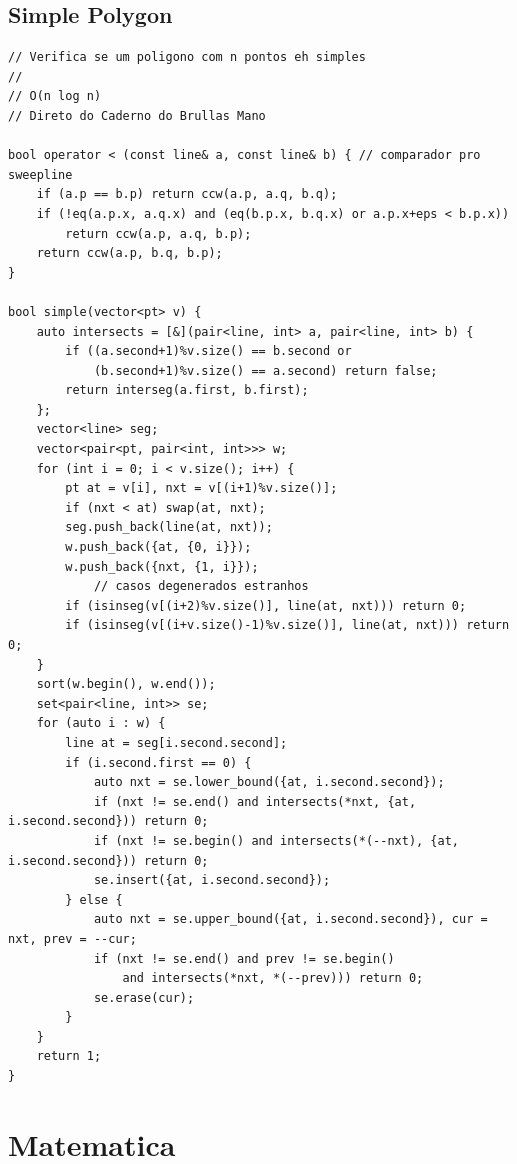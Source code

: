 \documentclass[11pt, a4paper, twoside]{article}
\begin{document}
\subsection{Simple Polygon}
\begin{verbatim}
// Verifica se um poligono com n pontos eh simples
//
// O(n log n)
// Direto do Caderno do Brullas Mano

bool operator < (const line& a, const line& b) { // comparador pro sweepline
	if (a.p == b.p) return ccw(a.p, a.q, b.q);
	if (!eq(a.p.x, a.q.x) and (eq(b.p.x, b.q.x) or a.p.x+eps < b.p.x))
		return ccw(a.p, a.q, b.p);
	return ccw(a.p, b.q, b.p);
}

bool simple(vector<pt> v) {
	auto intersects = [&](pair<line, int> a, pair<line, int> b) {
		if ((a.second+1)%v.size() == b.second or
			(b.second+1)%v.size() == a.second) return false;
		return interseg(a.first, b.first);
	};
	vector<line> seg;
	vector<pair<pt, pair<int, int>>> w;
	for (int i = 0; i < v.size(); i++) {
		pt at = v[i], nxt = v[(i+1)%v.size()];
		if (nxt < at) swap(at, nxt);
		seg.push_back(line(at, nxt));
		w.push_back({at, {0, i}});
		w.push_back({nxt, {1, i}});
    		// casos degenerados estranhos
		if (isinseg(v[(i+2)%v.size()], line(at, nxt))) return 0;
		if (isinseg(v[(i+v.size()-1)%v.size()], line(at, nxt))) return 0;
	}
	sort(w.begin(), w.end());
	set<pair<line, int>> se;
	for (auto i : w) {
		line at = seg[i.second.second];
		if (i.second.first == 0) {
			auto nxt = se.lower_bound({at, i.second.second});
			if (nxt != se.end() and intersects(*nxt, {at, i.second.second})) return 0;
			if (nxt != se.begin() and intersects(*(--nxt), {at, i.second.second})) return 0;
			se.insert({at, i.second.second});
		} else {
			auto nxt = se.upper_bound({at, i.second.second}), cur = nxt, prev = --cur;
			if (nxt != se.end() and prev != se.begin()
				and intersects(*nxt, *(--prev))) return 0;
			se.erase(cur);
		}
	}
	return 1;
}
\end{verbatim}



%
%

\section{Matematica}
\end{document}
